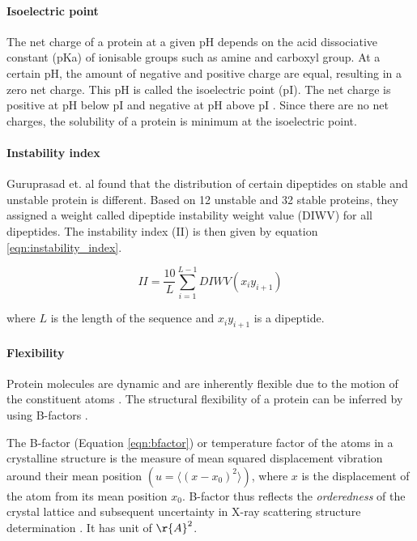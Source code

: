 \paragraph{Isoelectric point}
The net charge of a protein at a given pH depends on the acid dissociative constant (pKa) of ionisable groups such as amine and carboxyl group. At a certain pH, the amount of negative and positive charge are equal, resulting in a zero net charge. This pH is called the isoelectric point (pI). The net charge is positive at pH below pI and negative at pH above pI \cite{shaw2001effect}. Since there are no net charges, the solubility of a protein is minimum at the isoelectric point.

\paragraph{Instability index}
Guruprasad et. al \cite{guruprasad1990correlation} found that the distribution of certain dipeptides on stable and unstable protein is different. Based on 12 unstable and 32 stable proteins, they assigned a weight called dipeptide instability weight value (DIWV) for all dipeptides. The instability index (II) is then given by equation \ref{eqn:instability_index}.

\begin{equation}
    II = \frac{10}{L}\sum_{i=1}^{L-1}DIWV(x_i y_{i+1})
    \label{eqn:instability_index}
\end{equation}

where $L$ is the length of the sequence and $x_i y_{i+1}$ is a dipeptide.


\paragraph{Flexibility}
Protein molecules are dynamic and are inherently flexible due to the motion of the constituent atoms \cite{vihinen1994accuracy, alvarez2014relationship, teilum2009functional}. The structural flexibility of a protein can be inferred by using B-factors \cite{vihinen1994accuracy, Karplus1985-ea, Smith2003-gb}.


The B-factor (Equation \ref{eqn:bfactor}) or temperature factor of the atoms in a crystalline structure is the measure of mean squared displacement vibration around their mean position $(u = \langle (x-x_0)^2 \rangle)$, where $x$ is the displacement of the atom from its mean position $x_0$. B-factor thus reflects the \textit{orderedness} of the crystal lattice and subsequent uncertainty in X-ray scattering structure determination \cite{Schlessinger2005-ps, Carugo2018-ka, Bramer2018-dh}. It has unit of $\r{A}^2$.


